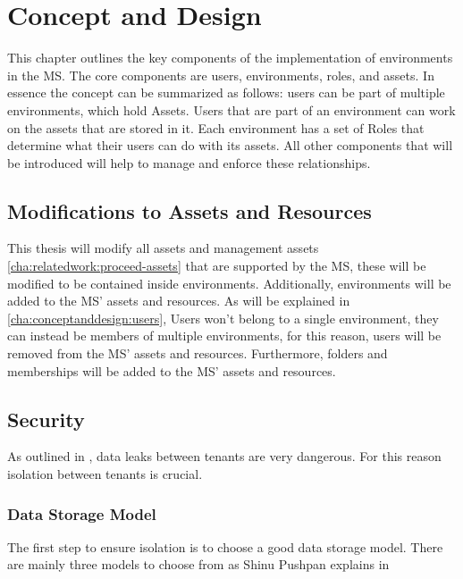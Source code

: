 \chapter{Concept and Design}
\label{cha:conceptanddesign}

This chapter outlines the key components of the implementation of environments in the MS.
The core components are users, environments, roles, and assets.
In essence the concept can be summarized as follows: users can be part of multiple
environments, which hold Assets.
Users that are part of an environment can work on the assets that are stored in it.
Each environment has a set of Roles that determine what their users can do with its
assets.
All other components that will be introduced will help to manage and enforce these relationships.

\section{Modifications to Assets and Resources}

This thesis will modify all assets and management assets \ref{cha:relatedwork:proceed-assets}
that are supported by the MS,
these will be modified to be contained inside environments.
Additionally, environments will be added to the MS' assets and resources.
As will be explained in \ref{cha:conceptanddesign:users}, Users won't belong to a single
environment, they can instead be members of multiple environments, for this reason,
users will be removed from the MS' assets and resources.
Furthermore, folders and  memberships will be added to the MS' assets and
resources.

\section{Security}

As outlined in \cite[3.3]{multi-tenant-dream-or-nightmare}, data leaks between tenants are
very dangerous. For this reason isolation between tenants is crucial.

\subsection{Data Storage Model}

The first step to ensure isolation is to choose a good data storage model.
There are mainly three models to choose from as Shinu Pushpan explains in
\cite[4.1]{Pushpan2024MultiTenantArchitecture}

